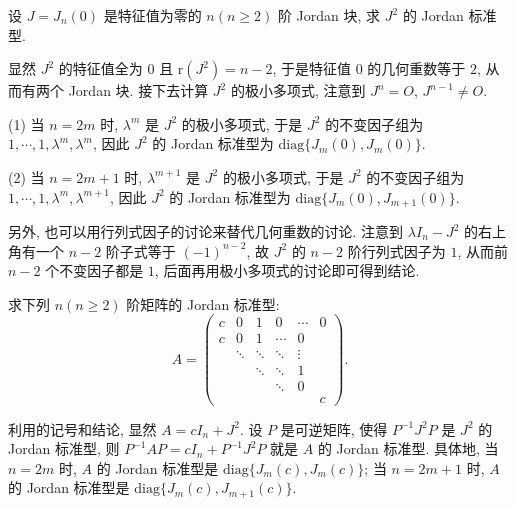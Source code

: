 \documentclass[../../main.tex]{subfiles}%
\begin{document}
\begin{example}\label{example:J_n(0)的Jordan标准型}
设 $J = J_n(0)$ 是特征值为零的 $n(n \geqslant  2)$ 阶 Jordan 块, 求 $J^2$ 的 Jordan 标准型.
\end{example}
\begin{solution}
显然 $J^2$ 的特征值全为 $0$ 且 $\mathrm{r}(J^2) = n - 2$, 于是特征值 $0$ 的几何重数等于 $2$, 从而有两个 Jordan 块. 接下去计算 $J^2$ 的极小多项式, 注意到 $J^n = O$, $J^{n - 1} \neq O$.

(1) 当 $n = 2m$ 时, $\lambda^m$ 是 $J^2$ 的极小多项式, 于是 $J^2$ 的不变因子组为 $1,\cdots,1,\lambda^m,\lambda^m$, 因此 $J^2$ 的 Jordan 标准型为 $\mathrm{diag}\{J_m(0),J_m(0)\}$.

(2) 当 $n = 2m + 1$ 时, $\lambda^{m + 1}$ 是 $J^2$ 的极小多项式, 于是 $J^2$ 的不变因子组为 $1,\cdots,1,\lambda^m,\lambda^{m + 1}$, 因此 $J^2$ 的 Jordan 标准型为 $\mathrm{diag}\{J_m(0),J_{m + 1}(0)\}$.

另外, 也可以用行列式因子的讨论来替代几何重数的讨论. 注意到 $\lambda I_n - J^2$ 的右上角有一个 $n - 2$ 阶子式等于 $(-1)^{n - 2}$, 故 $J^2$ 的 $n - 2$ 阶行列式因子为 $1$, 从而前 $n - 2$ 个不变因子都是 $1$, 后面再用极小多项式的讨论即可得到结论.

\end{solution}

\begin{example}
求下列 $n(n \geqslant  2)$ 阶矩阵的 Jordan 标准型:
\[
A = \begin{pmatrix}
c & 0 & 1 & 0 & \cdots & 0 \\
c & 0 & 1 & \cdots & 0 \\
& \ddots & \ddots & \ddots & \vdots \\
& & \ddots & \ddots & 1 \\
& & & \ddots & 0 \\
& & & & & c
\end{pmatrix}.
\]
\end{example}
\begin{solution}
利用的记号和结论, 显然 $A = cI_n + J^2$. 设 $P$ 是可逆矩阵, 使得 $P^{-1}J^2P$ 是 $J^2$ 的 Jordan 标准型, 则 $P^{-1}AP = cI_n + P^{-1}J^2P$ 就是 $A$ 的 Jordan 标准型. 具体地, 当 $n = 2m$ 时, $A$ 的 Jordan 标准型是 $\mathrm{diag}\{J_m(c),J_m(c)\}$; 当 $n = 2m + 1$ 时, $A$ 的 Jordan 标准型是 $\mathrm{diag}\{J_m(c),J_{m + 1}(c)\}$.

\end{solution}

\vspace{0.5cm}
\end{document}
